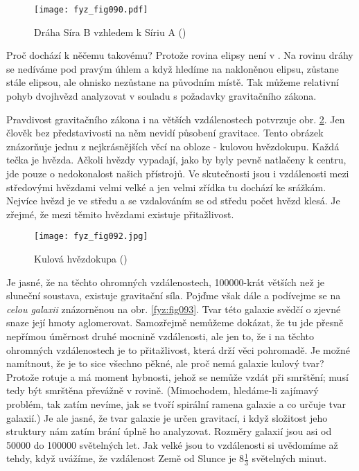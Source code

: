 {    \begin{figure}[ht!]  %
      \centering
      \texttt{[image: fyz\_fig090.pdf]}
      \caption{Dráha Síra B vzhledem k Síriu A (\cite[s.~99]{Feynman01})}
      \label{fyz:fig090}
    \end{figure}
    
    Proč dochází k něčemu takovému? Protože rovina elipsy není v . Na rovinu 
    dráhy se nedíváme pod pravým úhlem a když hledíme na nakloněnou elipsu, zůstane stále elipsou, 
    ale ohnisko nezůstane na původním místě. Tak můžeme relativní pohyb dvojhvězd analyzovat v 
    souladu s požadavky gravitačního zákona. 
    
    Pravdivost gravitačního zákona i na větších vzdálenostech potvrzuje obr. \ref{fyz:fig092}. Jen 
    člověk bez představivosti na něm nevidí působení gravitace. Tento obrázek znázorňuje jednu z 
    nejkrásnějších věcí na obloze - kulovou hvězdokupu. Každá tečka je hvězda. Ačkoli hvězdy 
    vypadají, jako by byly pevně natlačeny k centru, jde pouze o nedokonalost našich přístrojů. Ve 
    skutečnosti jsou i vzdálenosti mezi středovými hvězdami velmi velké a jen velmi zřídka tu 
    dochází ke srážkám. Nejvíce hvězd je ve středu a se vzdalováním se od středu počet hvězd klesá. 
    Je zřejmé, že mezi těmito hvězdami existuje přitažlivost. 
    
    \begin{figure}[ht!]  %
      \centering
      \texttt{[image: fyz\_fig092.jpg]}
      \caption{Kulová hvězdokupa (\cite[s.~100]{Feynman01})}
      \label{fyz:fig092}
    \end{figure}
    Je jasné, že na těchto ohromných vzdálenostech, \num{100000}-krát větších než je sluneční 
    soustava, existuje gravitační síla. Pojďme však dále a podívejme se na \emph{celou galaxii} 
    znázorněnou na obr. \ref{fyz:fig093}. Tvar této galaxie svědčí o zjevné snaze její hmoty 
    aglomerovat. Samozřejmě nemůžeme dokázat, že tu jde přesně nepřímou úměrnost druhé mocnině 
    vzdálenosti, ale jen to, že i na těchto ohromných vzdálenostech je to přitažlivost, která drží 
    věci pohromadě. Je možné namítnout, že je to sice všechno pěkné, ale proč nemá galaxie kulový 
    tvar? Protože rotuje a má moment hybnosti, jehož se nemůže vzdát při smrštění; musí tedy být 
    smrštěna převážně v rovině. (Mimochodem, hledáme-li zajímavý problém, tak zatím nevíme, jak se 
    tvoří spirální ramena galaxie a co určuje tvar galaxií.) Je ale jasné, že tvar galaxie je určen 
    gravitací, i když složitost jeho struktury nám zatím brání úplně ho analyzovat. Rozměry galaxií 
    jsou asi od \num{50000} do \num{100000} světelných let. Jak velké jsou to vzdálenosti si 
    uvědomíme až tehdy, když uvážíme, že vzdálenost Země od Slunce je  \(8\tfrac{1}{3}\) světelných 
    minut. 
    
}
